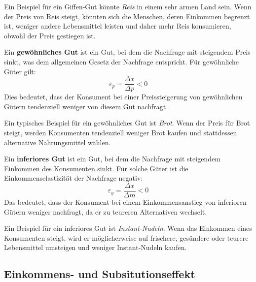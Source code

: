 \begin{example}
	Ein Beispiel für ein Giffen-Gut könnte \textit{Reis} in einem sehr armen Land sein. Wenn der Preis von Reis steigt, könnten sich die Menschen, deren Einkommen begrenzt ist, weniger andere Lebensmittel leisten und daher mehr Reis konsumieren, obwohl der Preis gestiegen ist.
\end{example}

\begin{definition}
	Ein \textbf{gewöhnliches Gut} ist ein Gut, bei dem die Nachfrage mit steigendem Preis sinkt, was dem allgemeinen Gesetz der Nachfrage entspricht. Für gewöhnliche Güter gilt:
	\[
		\varepsilon_p = \frac{\Delta x}{\Delta p} < 0
	\]
	Dies bedeutet, dass der Konsument bei einer Preissteigerung von gewöhnlichen Gütern tendenziell weniger von diesem Gut nachfragt.
\end{definition}


\begin{example}
	Ein typisches Beispiel für ein gewöhnliches Gut ist \textit{Brot}. Wenn der Preis für Brot steigt, werden Konsumenten tendenziell weniger Brot kaufen und stattdessen alternative Nahrungsmittel wählen.
\end{example}

\begin{definition}
	Ein \textbf{inferiores Gut} ist ein Gut, bei dem die Nachfrage mit steigendem Einkommen des Konsumenten sinkt. Für solche Güter ist die Einkommenselastizität der Nachfrage negativ:
	\[
		\varepsilon_y = \frac{\Delta x}{\Delta m} < 0
	\]
	Das bedeutet, dass der Konsument bei einem Einkommensanstieg von inferioren Gütern weniger nachfragt, da er zu teureren Alternativen wechselt.
\end{definition}

\begin{example}
	Ein Beispiel für ein inferiores Gut ist \textit{Instant-Nudeln}. Wenn das Einkommen eines Konsumenten steigt, wird er möglicherweise auf frischere, gesündere oder teurere Lebensmittel umsteigen und weniger Instant-Nudeln kaufen.
\end{example}


\subsection{Einkommens- und Subsitutionseffekt}

